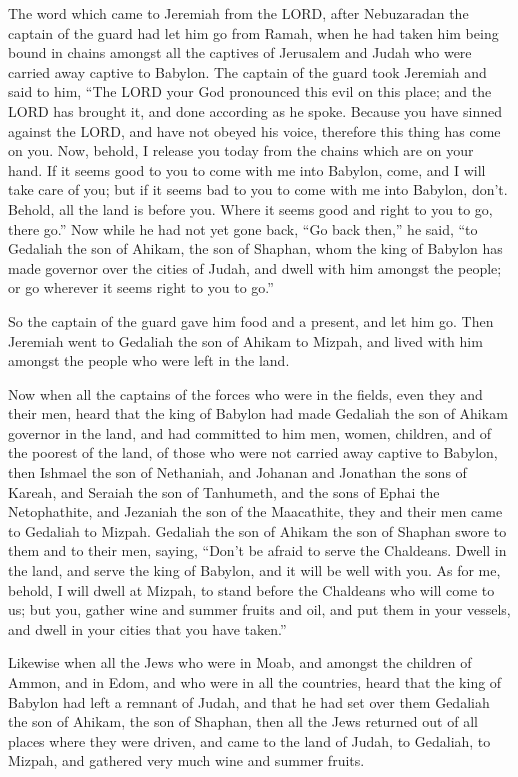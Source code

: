  The word which came to Jeremiah from the LORD, after
Nebuzaradan the captain of the guard had let him go from Ramah, when he
had taken him being bound in chains amongst all the captives of
Jerusalem and Judah who were carried away captive to Babylon.
 The captain of the guard took Jeremiah and said to him,
``The LORD your God pronounced this evil on this place;  and
the LORD has brought it, and done according as he spoke. Because you
have sinned against the LORD, and have not obeyed his voice, therefore
this thing has come on you.  Now, behold, I release you
today from the chains which are on your hand. If it seems good to you to
come with me into Babylon, come, and I will take care of you; but if it
seems bad to you to come with me into Babylon, don't. Behold, all the
land is before you. Where it seems good and right to you to go, there
go.''  Now while he had not yet gone back, ``Go back then,''
he said, ``to Gedaliah the son of Ahikam, the son of Shaphan, whom the
king of Babylon has made governor over the cities of Judah, and dwell
with him amongst the people; or go wherever it seems right to you to
go.''

So the captain of the guard gave him food and a present, and let him go.
 Then Jeremiah went to Gedaliah the son of Ahikam to Mizpah,
and lived with him amongst the people who were left in the land.

 Now when all the captains of the forces who were in the
fields, even they and their men, heard that the king of Babylon had made
Gedaliah the son of Ahikam governor in the land, and had committed to
him men, women, children, and of the poorest of the land, of those who
were not carried away captive to Babylon,  then Ishmael the
son of Nethaniah, and Johanan and Jonathan the sons of Kareah, and
Seraiah the son of Tanhumeth, and the sons of Ephai the Netophathite,
and Jezaniah the son of the Maacathite, they and their men came to
Gedaliah to Mizpah.  Gedaliah the son of Ahikam the son of
Shaphan swore to them and to their men, saying, ``Don't be afraid to
serve the Chaldeans. Dwell in the land, and serve the king of Babylon,
and it will be well with you.  As for me, behold, I will
dwell at Mizpah, to stand before the Chaldeans who will come to us; but
you, gather wine and summer fruits and oil, and put them in your
vessels, and dwell in your cities that you have taken.''

 Likewise when all the Jews who were in Moab, and amongst
the children of Ammon, and in Edom, and who were in all the countries,
heard that the king of Babylon had left a remnant of Judah, and that he
had set over them Gedaliah the son of Ahikam, the son of Shaphan,
 then all the Jews returned out of all places where they
were driven, and came to the land of Judah, to Gedaliah, to Mizpah, and
gathered very much wine and summer fruits.

